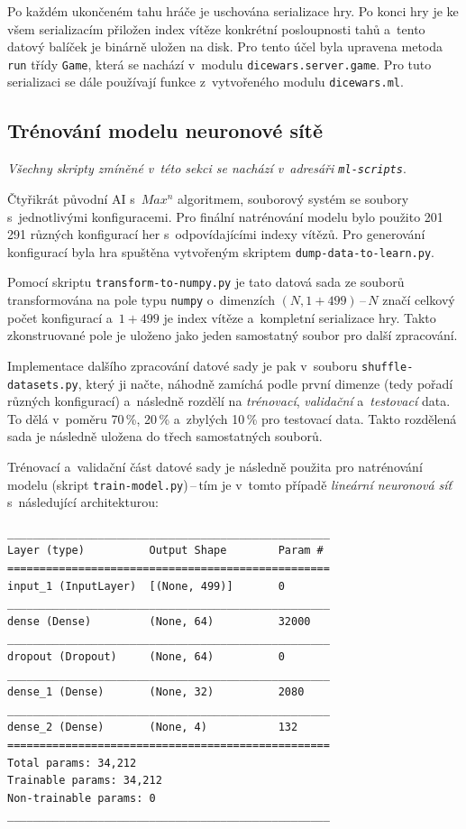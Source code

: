 \documentclass[11pt, a4paper]{article}
\theoremstyle{definition}
\begin{document}
Po každém ukončeném tahu hráče je uschována serializace hry.
Po konci hry je ke všem serializacím přiložen index vítěze konkrétní posloupnosti tahů a~tento datový balíček
je binárně uložen na disk. Pro tento účel byla upravena metoda \texttt{run} třídy \texttt{Game}, která se nachází v~modulu
\texttt{dicewars.server.game}. Pro tuto serializaci se dále používají funkce z~vytvořeného modulu
\texttt{dicewars.ml}.

\subsection{Trénování modelu neuronové sítě}
\label{sec:trainModel}

\textit{Všechny skripty zmíněné v~této sekci se nachází v~adresáři \texttt{ml-scripts}}.

Čtyřikrát původní AI s~$ Max^n $ algoritmem, souborový systém se soubory s~jednotlivými konfiguracemi. Pro finální natrénování modelu bylo použito 201\,291 různých konfigurací her s~odpovídajícími indexy vítězů. Pro generování konfigurací byla hra spuštěna vytvořeným skriptem \texttt{dump-data-to-learn.py}.

Pomocí skriptu \texttt{transform-to-numpy.py} je tato datová sada ze souborů transformována na pole typu \texttt{numpy} o~dimenzích $(N, 1 + 499)$\,--\,$N$ značí celkový počet konfigurací a~$1 + 499$ je index vítěze a~kompletní serializace hry. Takto zkonstruované pole je uloženo jako jeden samostatný soubor pro další zpracování.

Implementace dalšího zpracování datové sady je pak v~souboru \texttt{shuffle-datasets.py}, který ji načte, náhodně zamíchá podle první dimenze (tedy pořadí různých konfigurací) a~následně rozdělí na \emph{trénovací}, \emph{validační} a~\emph{testovací} data. To dělá v~poměru 70\,\%, 20\,\% a~zbylých 10\,\% pro testovací data. Takto rozdělená sada je následně uložena do třech samostatných souborů.

Trénovací a~validační část datové sady je následně použita pro natrénování modelu (skript \texttt{train-model.py})\,--\,tím je v~tomto případě \emph{lineární neuronová síť} s~následující architekturou: 

\begin{verbatim}
__________________________________________________
Layer (type)          Output Shape        Param #
==================================================
input_1 (InputLayer)  [(None, 499)]       0
__________________________________________________
dense (Dense)         (None, 64)          32000
__________________________________________________
dropout (Dropout)     (None, 64)          0
__________________________________________________
dense_1 (Dense)       (None, 32)          2080
__________________________________________________
dense_2 (Dense)       (None, 4)           132
==================================================
Total params: 34,212
Trainable params: 34,212
Non-trainable params: 0
__________________________________________________
\end{verbatim}
\end{document}
